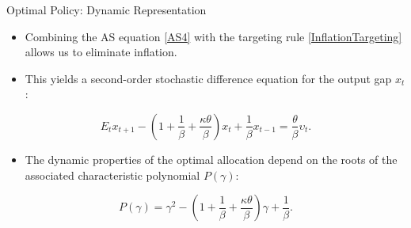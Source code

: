 \documentclass[11pt,aspectratio=169]{beamer}
\begin{document}
\begin{frame}{Optimal Policy: Dynamic Representation}
\small

\begin{itemize}
  \item Combining the AS equation \eqref{AS4} with the targeting rule \eqref{InflationTargeting} allows us to eliminate inflation.
  \item This yields a second-order stochastic difference equation for the output gap $x_{t}$:
\end{itemize}

\begin{equation}
E_{t}x_{t+1}-\left( 1+\frac{1}{\beta }+\frac{\kappa \theta }{\beta }\right)
x_{t}+\frac{1}{\beta }x_{t-1}=\frac{\theta }{\beta }\upsilon _{t}.
\label{eqopt}
\end{equation}

\begin{itemize}
  \item The dynamic properties of the optimal allocation depend on the roots of the associated characteristic polynomial $P(\gamma)$:
\end{itemize}

\begin{equation}
P(\gamma )=\gamma ^{2}-\left( 1+\frac{1}{\beta }+\frac{\kappa \theta }{\beta
}\right) \gamma +\frac{1}{\beta }. \label{Poly}
\end{equation}

\end{frame}
\end{document}
